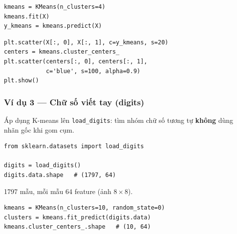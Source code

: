 \begin{vidu}[title={Huấn luyện và dự đoán}]
\begin{lstlisting}
kmeans = KMeans(n_clusters=4)
kmeans.fit(X)
y_kmeans = kmeans.predict(X)
\end{lstlisting}
\end{vidu}

\begin{vidu}[title={Vẽ cụm và tâm}]
\begin{lstlisting}
plt.scatter(X[:, 0], X[:, 1], c=y_kmeans, s=20)
centers = kmeans.cluster_centers_
plt.scatter(centers[:, 0], centers[:, 1],
            c='blue', s=100, alpha=0.9)
plt.show()
\end{lstlisting}
\end{vidu}

\begin{ynghia}[title={Centroid học được}]
\end{ynghia}

\subsubsection{Ví dụ 3 --- Chữ số viết tay (digits)}

\begin{dongco}[title={Bối cảnh}]
Áp dụng K-means lên \texttt{load\_digits}: tìm nhóm chữ số tương tự \textbf{không} dùng nhãn gốc khi gom cụm.
\end{dongco}

\begin{vidu}[title={Nạp dữ liệu}]
\begin{lstlisting}
from sklearn.datasets import load_digits

digits = load_digits()
digits.data.shape   # (1797, 64)
\end{lstlisting}
\end{vidu}

\begin{ynghia}[title={Kích thước}]
1797 mẫu, mỗi mẫu 64 feature (ảnh $8 \times 8$).
\end{ynghia}

\begin{vidu}[title={Phân cụm 10 nhóm}]
\begin{lstlisting}
kmeans = KMeans(n_clusters=10, random_state=0)
clusters = kmeans.fit_predict(digits.data)
kmeans.cluster_centers_.shape   # (10, 64)
\end{lstlisting}
\end{vidu}

